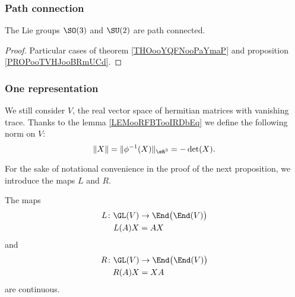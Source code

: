 \subsubsection{Path connection}

\begin{proposition}     \label{PROPooLEKXooSXPhRX}
	The Lie groups \( \SO(3)\) and \( \SU(2)\) are path connected.
\end{proposition}

\begin{proof}
	Particular cases of theorem \ref{THOooYQFNooPaYmaP} and proposition \ref{PROPooTVHJooBRmUCd}.
\end{proof}

\subsubsection{One representation}

We still consider \( V\), the real vector space of hermitian matrices with vanishing trace. Thanks to the lemma \ref{LEMooRFBTooIRDbEq} we define the following norm on \( V\):
\begin{equation}
	\| X \|=\| \phi^{-1}(X) \|_{\eR^3}=-\det(X).
\end{equation}

For the sake of notational convenience in the proof of the next proposition, we introduce the maps \( L\) and \( R\).
\begin{lemma}       \label{LEMooQVYXooQFNaGc}
	The maps
	\begin{equation}
		\begin{aligned}
			L\colon \GL(V) & \to \End\big( \End(V) \big) \\
			L(A)X          & =AX
		\end{aligned}
	\end{equation}
	and
	\begin{equation}
		\begin{aligned}
			R\colon \GL(V) & \to \End\big( \End(V) \big) \\
			R(A)X          & =XA
		\end{aligned}
	\end{equation}
	are continuous.
\end{lemma}

